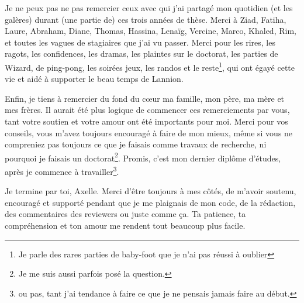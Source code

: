 Je ne peux pas ne pas remercier ceux avec qui j'ai partagé mon quotidien (et les galères) durant (une partie de) ces trois années de thèse. Merci à Ziad, Fatiha, Laure, Abraham, Diane, Thomas, Hassina, Lenaïg, Vercine, Marco, Khaled, Rim, et toutes les vagues de stagiaires que j'ai vu passer. Merci pour les rires, les ragots, les confidences, les dramas, les plaintes sur le doctorat, les parties de Wizard, de ping-pong, les soirées jeux, les randos et le reste\footnote{Je parle des rares parties de baby-foot que je n'ai pas réussi à oublier}, qui ont égayé cette vie et aidé à supporter le beau temps de Lannion.

Enfin, je tiens à remercier du fond du cœur ma famille, mon père, ma mère et mes frères. Il aurait été plus logique de commencer ces remerciements par vous, tant votre soutien et votre amour ont été importants pour moi. Merci pour vos conseils, vous m'avez toujours encouragé à faire de mon mieux, même si vous ne compreniez pas toujours ce que je faisais comme travaux de recherche, ni pourquoi je faisais un doctorat\footnote{Je me suis aussi parfois posé la question.}. Promis, c'est mon dernier diplôme d'études, après je commence à travailler\footnote{ou pas, tant j'ai tendance à faire ce que je ne pensais jamais faire au début.}.

Je termine par toi, Axelle. Merci d'être toujours à mes côtés, de m'avoir soutenu, encouragé et supporté pendant que je me plaignais de mon code, de la rédaction, des commentaires des reviewers ou juste comme ça. Ta patience, ta compréhension et ton amour me rendent tout beaucoup plus facile.
